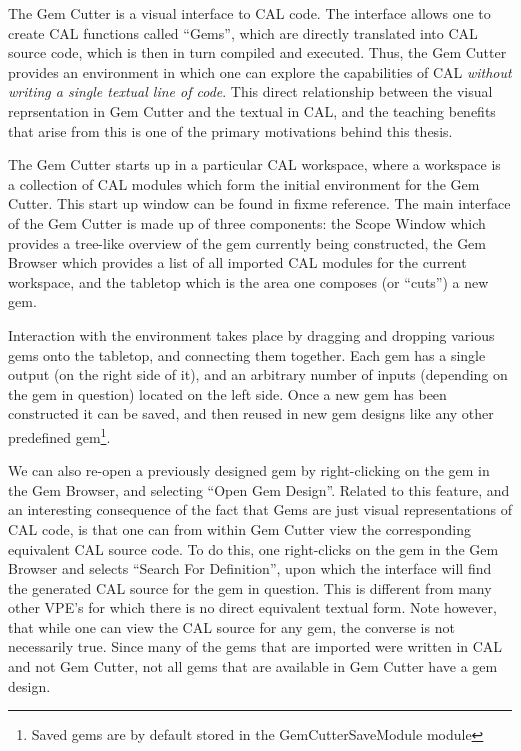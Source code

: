 The Gem Cutter is a visual interface to CAL code.  The interface allows one to create CAL functions called ``Gems'', which are directly translated into CAL source code, which is then in turn compiled and executed.  Thus, the Gem Cutter provides an environment in which one can explore the capabilities of CAL \emph{without writing a single textual line of code}.  This direct relationship between the visual reprsentation in Gem Cutter and the textual in CAL, and the teaching benefits that arise from this is one of the primary motivations behind this thesis.

The Gem Cutter starts up in a particular CAL workspace, where a workspace is a collection of CAL modules which form the initial environment for the Gem Cutter.  This start up window can be found in fixme reference.  The main interface of the Gem Cutter is made up of three components: the Scope Window which provides a tree-like overview of the gem currently being constructed, the Gem Browser which provides a list of all imported CAL modules for the current workspace, and the tabletop which is the area one composes (or ``cuts'') a new gem.

Interaction with the environment takes place by dragging and dropping various gems onto the tabletop, and connecting them together.  Each gem has a single output (on the right side of it), and an arbitrary number of inputs (depending on the gem in question) located on the left side.  Once a new gem has been constructed it can be saved, and then reused in new gem designs like any other predefined gem\footnote{Saved gems are by default stored in the GemCutterSaveModule module}.

We can also re-open a previously designed gem by right-clicking on the gem in the Gem Browser, and selecting ``Open Gem Design''.  Related to this feature, and an interesting consequence of the fact that Gems are just visual representations of CAL code, is that one can from within Gem Cutter view the corresponding equivalent CAL source code.  To do this, one right-clicks on the gem in the Gem Browser and selects ``Search For Definition'', upon which the interface will find the generated CAL source for the gem in question.  This is different from many other VPE's for which there is no direct equivalent textual form.  Note however, that while one can view the CAL source for any gem, the converse is not necessarily true.  Since many of the gems that are imported were written in CAL and not Gem Cutter, not all gems that are available in Gem Cutter have a gem design.

